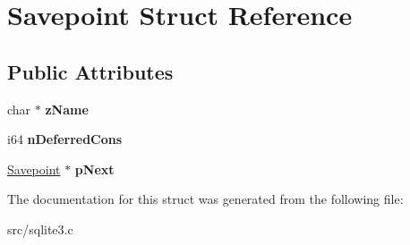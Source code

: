 \hypertarget{struct_savepoint}{\section{Savepoint Struct Reference}
\label{struct_savepoint}
}
\subsection*{Public Attributes}
\begin{DoxyCompactItemize}
\item 
\hypertarget{struct_savepoint_a0ba08ea77fcfd93099288375e2e9b1ec}{char $\ast$ {\bfseries z\-Name}}\label{struct_savepoint_a0ba08ea77fcfd93099288375e2e9b1ec}

\item 
\hypertarget{struct_savepoint_ae00dd8f725701d9e31da2edbb0b27435}{i64 {\bfseries n\-Deferred\-Cons}}\label{struct_savepoint_ae00dd8f725701d9e31da2edbb0b27435}

\item 
\hypertarget{struct_savepoint_a8d785c3c0eeb6f0c62ea5391892c78cb}{\hyperlink{struct_savepoint}{Savepoint} $\ast$ {\bfseries p\-Next}}\label{struct_savepoint_a8d785c3c0eeb6f0c62ea5391892c78cb}

\end{DoxyCompactItemize}


The documentation for this struct was generated from the following file\-:\begin{DoxyCompactItemize}
\item 
src/sqlite3.\-c\end{DoxyCompactItemize}

